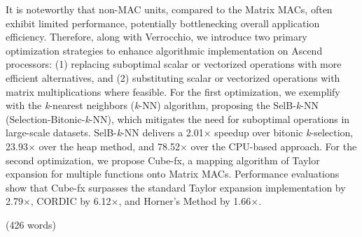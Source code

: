 It is noteworthy that non-MAC units, compared to the Matrix MACs, often exhibit limited performance, potentially bottlenecking overall application efficiency. Therefore, along with Verrocchio, we introduce two primary optimization strategies to enhance algorithmic implementation on Ascend processors: (1) replacing suboptimal scalar or vectorized operations with more efficient alternatives, and (2) substituting scalar or vectorized operations with matrix multiplications where feasible. For the first optimization, we exemplify with the \textit{k}-nearest neighbors (\textit{k}-NN) algorithm, proposing the SelB-\textit{k}-NN (Selection-Bitonic-\textit{k}-NN), which mitigates the need for suboptimal operations in large-scale datasets. SelB-\textit{k}-NN delivers a 2.01$\times$ speedup over bitonic \textit{k}-selection, 23.93$\times$ over the heap method, and 78.52$\times$ over the CPU-based approach. For the second optimization, we propose Cube-fx, a mapping algorithm of Taylor expansion for multiple functions onto Matrix MACs. Performance evaluations show that Cube-fx surpasses the standard Taylor expansion implementation by 2.79$\times$, CORDIC by 6.12$\times$, and Horner's Method by 1.66$\times$.

(426 words)